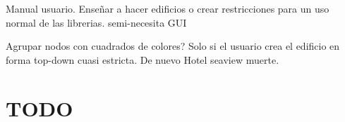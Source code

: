 \begin{DoxyItemize}
\item Manual usuario. Enseñar a hacer edificios o crear restricciones para un uso normal de las librerias. semi-\/necesita G\-U\-I
\end{DoxyItemize}


\begin{DoxyItemize}
\item Agrupar nodos con cuadrados de colores? Solo si el usuario crea el edificio en forma top-\/down cuasi estricta. De nuevo Hotel seaview muerte.
\end{DoxyItemize}

\section*{T\-O\-D\-O}